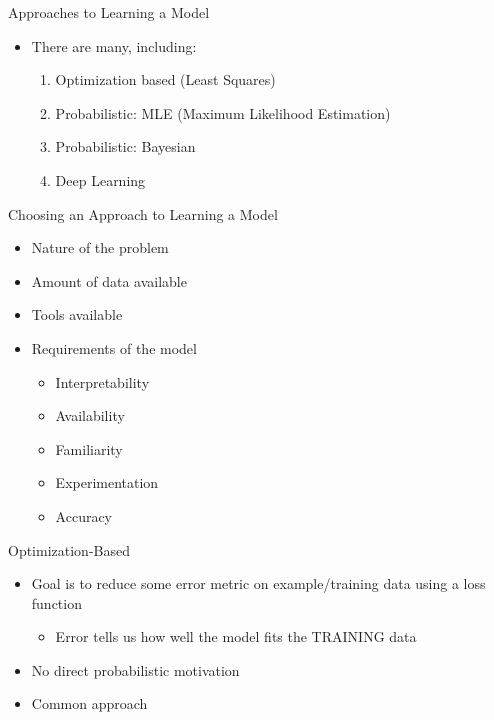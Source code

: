 \documentclass[aspectratio=169]{beamer}
\begin{document}
\begin{frame}{Approaches to Learning a Model}

\begin{itemize}
\item There are many, including:
\begin{enumerate}
\item Optimization based (Least Squares)
\item Probabilistic: MLE (Maximum Likelihood Estimation)
\item Probabilistic: Bayesian
\item Deep Learning
\end{enumerate}
\end{itemize}
\end{frame}
\begin{frame}{Choosing an Approach to Learning a Model}

\begin{itemize}
\item Nature of the problem
\item Amount of data available
\item Tools available
\item Requirements of the model
\begin{itemize}
\item Interpretability
\item Availability
\item Familiarity
\item Experimentation
\item Accuracy
\end{itemize}
\end{itemize}
\end{frame}
\begin{frame}{Optimization-Based}

\begin{itemize}
\item Goal is to reduce some error metric on example/training data using a loss function
\begin{itemize}
\item Error tells us how well the model fits the TRAINING data
\end{itemize}
\item No direct probabilistic motivation
\item Common approach
\end{itemize}
\end{frame}
\end{document}
